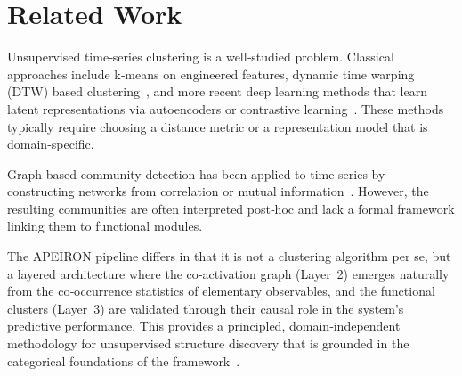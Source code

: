 \section{Related Work}\label{sec:related}
Unsupervised time‑series clustering is a well‑studied problem.
Classical approaches include k‑means on engineered features, dynamic time warping (DTW) based clustering~\cite{Keogh2005}, and more recent deep learning methods that learn latent representations via autoencoders or contrastive learning~\cite{Franceschi2019}.
These methods typically require choosing a distance metric or a representation model that is domain‑specific.

Graph‑based community detection has been applied to time series by constructing networks from correlation or mutual information~\cite{Lacasa2008}.
However, the resulting communities are often interpreted post‑hoc and lack a formal framework linking them to functional modules.

The APEIRON pipeline differs in that it is not a clustering algorithm per se, but a layered architecture where the co‑activation graph (Layer~2) emerges naturally from the co‑occurrence statistics of elementary observables, and the functional clusters (Layer~3) are validated through their causal role in the system's predictive performance.
This provides a principled, domain‑independent methodology for unsupervised structure discovery that is grounded in the categorical foundations of the framework~\cite{Beniers2026Categorical}.